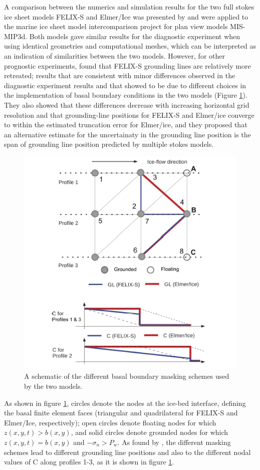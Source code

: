 \documentclass[a4paper,12pt]{article}
\begin{document}
A comparison between the numerics and simulation results for the two full stokes ice sheet models FELIX-S \cite[]{leng2012parallel} and Elmer/Ice \cite[]{gagliardini2013capabilities} was presented by \cite{zhang2017comparison} and were applied to the marine ice sheet model intercomparison project for plan view models MIS-MIP3d. Both models gave similar results for the diagnostic experiment when using identical geometries and computational meshes, which can be interpreted as an indication of similarities between the two models. However, for other prognostic experiments, \cite{zhang2017comparison} found that FELIX-S grounding lines are relatively more retreated; results that are consistent with minor differences observed in the diagnostic experiment results and that \cite{zhang2017comparison} showed to be due to different choices in the implementation of basal boundary conditions in the two models (Figure \ref{comparison}). They also showed that these differences decrease with increasing horizontal grid resolution and that grounding-line positions for FELIX-S and Elmer/ice converge to within the estimated truncation error for Elmer/ice, and they proposed that an alternative estimate for the uncertainaty in the grounding line position is the span of grounding line position predicted by multiple stokes models. 

\begin{figure}[!h]
	\centering
	\includegraphics[width=0.7\linewidth]{../fig/comparison}
	\caption{A schematic of the different basal boundary masking schemes used by the two models.}
	\label{comparison}
\end{figure}

As shown in figure \ref{comparison}, circles denote the nodes at the ice-bed interface, defining the basal finite element faces (triangular and quadrilateral for FELIX-S and Elmer/Ice, respectively); open circles denote floating nodes for which $z(x,y,t)>b(x,y)$, and solid circles denote grounded nodes for which $z(x,y,t)=b(x,y)$ and $-\sigma_n>P_w$. As found by \cite{zhang2017comparison}, the different masking schemes lead to different grounding line positions and also to the different nodal values of C along profiles 1-3, as it is shown in figure \ref{comparison}.
\end{document}
